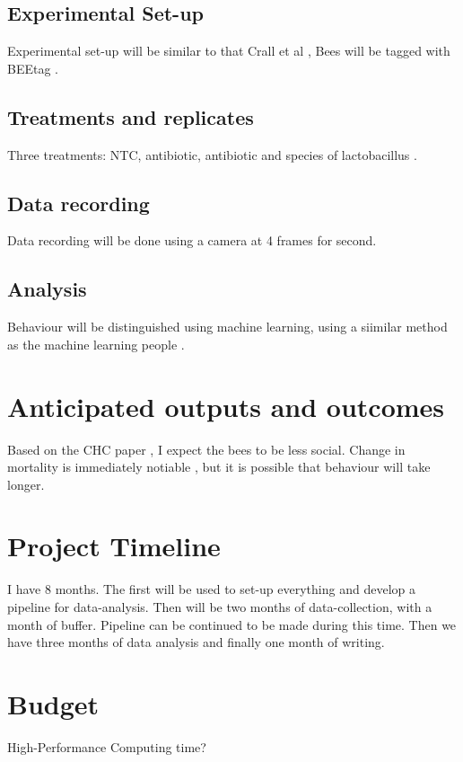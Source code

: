 \documentclass[11pt]{article}
\begin{document}
        \subsection{Experimental Set-up}
            Experimental set-up will be similar to that Crall et al
            \cite{crall2018neonicotinoid},
            Bees will be tagged with BEEtag
            \cite{crall2015beetag}.

        \subsection{Treatments and replicates}
            Three treatments: NTC, antibiotic, antibiotic and species of lactobacillus
            \cite{ptaszynska2016commercial}. 

        \subsection{Data recording}
            Data recording will be done using a camera at 4 frames for second.
            
        \subsection{Analysis}
            Behaviour will be distinguished using machine learning, using a siimilar method as the machine learning people
            \cite{blut2017automated}.

    \section{Anticipated outputs and outcomes}
        Based on the CHC paper
        \cite{vernier2020gut}, I expect the bees to be less social.
        Change in mortality is immediately notiable
        \cite{li2017new}, but it is possible that behaviour will take longer.

    \section{Project Timeline}
        I have 8 months. The first will be used to set-up everything and develop a pipeline for data-analysis.
        Then will be two months of data-collection, with a month of buffer.
        Pipeline can be continued to be made during this time.
        Then we have three months of data analysis and finally one month of writing.

    \section{Budget}
        High-Performance Computing time?
\end{document}

